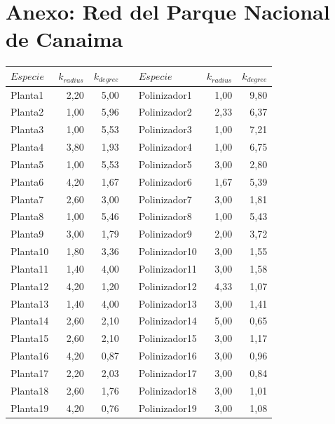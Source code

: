 \section{Anexo: Red del Parque Nacional de Canaima}
\label{ESTATICA_ANEXO_Canaima}
\begin{table}[htbp]
\fontsize{3mm}{3mm}\selectfont
  \centering

    \begin{tabular}{lrrrlrr}
    \toprule
    $Especie$ & $k_{radius}$ & $k_{degree}$ &      & $Especie$ & $k_{radius}$ & $k_{degree}$ \\
    \midrule
    Planta1 & 2,20 & 5,00 &      & Polinizador1 & 1,00 & 9,80 \\
    Planta2 & 1,00 & 5,96 &      & Polinizador2 & 2,33 & 6,37 \\
    Planta3 & 1,00 & 5,53 &      & Polinizador3 & 1,00 & 7,21 \\
    Planta4 & 3,80 & 1,93 &      & Polinizador4 & 1,00 & 6,75 \\
    Planta5 & 1,00 & 5,53 &      & Polinizador5 & 3,00 & 2,80 \\
    Planta6 & 4,20 & 1,67 &      & Polinizador6 & 1,67 & 5,39 \\
    Planta7 & 2,60 & 3,00 &      & Polinizador7 & 3,00 & 1,81 \\
    Planta8 & 1,00 & 5,46 &      & Polinizador8 & 1,00 & 5,43 \\
    Planta9 & 3,00 & 1,79 &      & Polinizador9 & 2,00 & 3,72 \\
    Planta10 & 1,80 & 3,36 &      & Polinizador10 & 3,00 & 1,55 \\
    Planta11 & 1,40 & 4,00 &      & Polinizador11 & 3,00 & 1,58 \\
    Planta12 & 4,20 & 1,20 &      & Polinizador12 & 4,33 & 1,07 \\
    Planta13 & 1,40 & 4,00 &      & Polinizador13 & 3,00 & 1,41 \\
    Planta14 & 2,60 & 2,10 &      & Polinizador14 & 5,00 & 0,65 \\
    Planta15 & 2,60 & 2,10 &      & Polinizador15 & 3,00 & 1,17 \\
    Planta16 & 4,20 & 0,87 &      & Polinizador16 & 3,00 & 0,96 \\
    Planta17 & 2,20 & 2,03 &      & Polinizador17 & 3,00 & 0,84 \\
    Planta18 & 2,60 & 1,76 &      & Polinizador18 & 3,00 & 1,01 \\
    Planta19 & 4,20 & 0,76 &      & Polinizador19 & 3,00 & 1,08 \\

\end{tabular}
\end{table}
